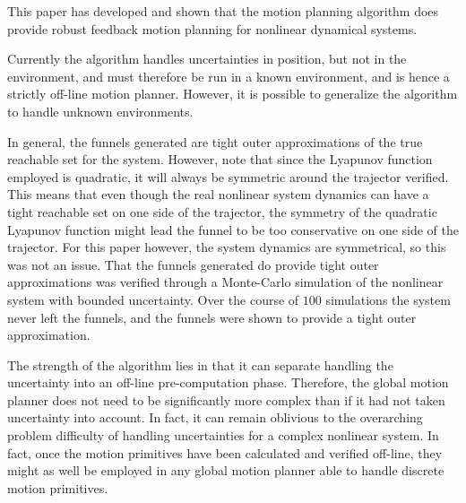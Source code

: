 
This paper has developed and shown that the \rrtfunnel{} motion planning
algorithm does provide robust feedback motion planning for nonlinear dynamical
systems.

Currently the algorithm handles uncertainties in position, but not in the
environment, and must therefore be run in a known environment, and is hence a
strictly off-line motion planner. However, it is possible to generalize the
algorithm to handle unknown environments.

In general, the funnels generated are tight outer approximations of the true
reachable set for the system. However, note that since the Lyapunov function
employed is quadratic, it will always be symmetric around the trajector
verified. This means that even though the real nonlinear system dynamics can
have a tight reachable set on one side of the trajector, the symmetry of the
quadratic Lyapunov function might lead the funnel to be too conservative on one
side of the trajector. For this paper however, the system dynamics are
symmetrical, so this was not an issue. That the funnels generated do provide
tight outer approximations was verified through a Monte-Carlo simulation
of the nonlinear system with bounded uncertainty. Over the course of \(100\)
simulations the system never left the funnels, and the funnels were shown to
provide a tight outer approximation.


The strength of the algorithm lies in that it can separate handling the
uncertainty into an off-line pre-computation phase. Therefore, the global motion
planner does not need to be significantly more complex than if it had not
taken uncertainty into account. In fact, it can remain oblivious to the
overarching problem difficulty of handling uncertainties for a complex nonlinear
system. In fact, once the motion primitives have been calculated and verified
off-line, they might as well be employed in any global motion planner able to
handle discrete motion primitives.


